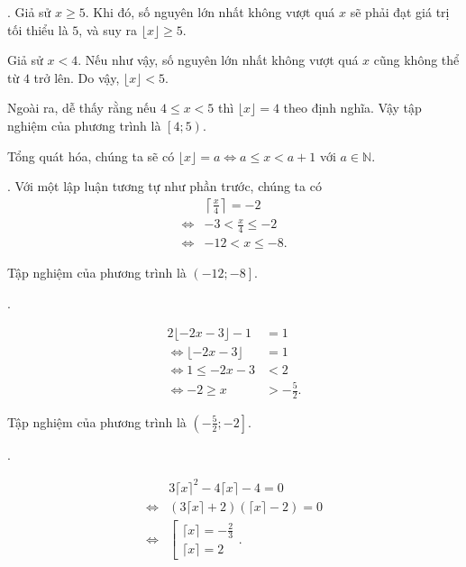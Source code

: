 \solution

\setcounter{subexercise}{1}

. Giả sử $x \geq 5$. Khi đó, số nguyên lớn nhất không vượt quá $x$ sẽ phải đạt giá trị tối thiểu là $5$, và suy ra $\lfloor x \rfloor \geq 5$.

Giả sử $x < 4$. Nếu như vậy, số nguyên lớn nhất không vượt quá $x$ cũng không thể từ $4$ trở lên. Do vậy, $\lfloor x \rfloor < 5$. 

Ngoài ra, dễ thấy rằng nếu $4 \leq x < 5$ thì $\lfloor x \rfloor = 4$ theo định nghĩa. Vậy tập nghiệm của phương trình là $\left[4; 5\right)$.

Tổng quát hóa, chúng ta sẽ có $\lfloor x \rfloor = a \iff a \leq x < a + 1$ với $a \in \mathbb{N}$.

. Với một lập luận tương tự như phần trước, chúng ta có
\begin{align*}
   &\left\lceil \frac{x}{4} \right\rceil = -2 \\
   \iff &-3 < \frac{x}{4} \leq -2 \\
   \iff &-12 < x \leq -8.
\end{align*}

Tập nghiệm của phương trình là $\left(-12; -8\right]$.

. 

\begin{align*}
   2\lfloor -2x - 3 \rfloor - 1 &= 1 \\
   \iff \lfloor -2x - 3 \rfloor &= 1 \\
   \iff 1 \leq -2x - 3 &< 2 \\
   \iff -2 \geq x &> -\frac{5}{2}.
\end{align*}

Tập nghiệm của phương trình là $\left(-\frac{5}{2}; -2\right]$.

.

\begin{align*}
   &3\lceil x \rceil^2 - 4\lceil x \rceil - 4 = 0 \\
   \iff &\left(3\lceil x \rceil + 2\right)\left(\lceil x \rceil - 2\right) = 0 \\
   \iff &\left[\begin{array}{l}
      \lceil x \rceil = -\frac{2}{3} \\
      \lceil x \rceil = 2
   \end{array}\right..
\end{align*}

